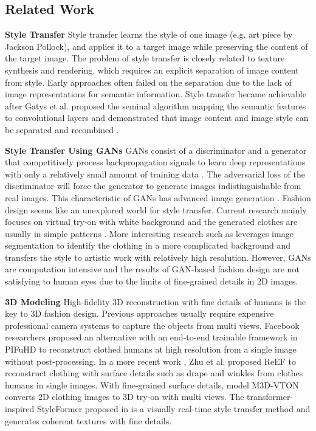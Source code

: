 \documentclass{article}
\begin{document}
\subsection{Related Work}

\textbf{Style Transfer} Style transfer learns the style of one image (e.g. art piece by Jackson Pollock), and applies it to a target image while preserving the content of the target image. The problem of style transfer is closely related to texture synthesis and rendering, which requires an explicit separation of image content from style. Early approaches\cite{Hertzmann2001st, Ashikhmin2003st} often failed on the separation due to the lack of image representations for semantic information. Style transfer became achievable after Gatys et al. proposed the seminal algorithm mapping the semantic features to convolutional layers and demonstrated that image content and image style can be separated and recombined \cite{gatys2016styleTransfer}. 

\textbf{Style Transfer Using GANs} GANs consist of a discriminator and a generator that competitively process backpropagation signals to learn deep representations with only a relatively small amount of training data \cite{creswell2018GANoverview, goodfellow2014GAN}. The adversarial loss of the discriminator will force the generator to generate images indistinguishable from real images. This characteristic of GANs has advanced image generation \cite{denton2015deepGAN, radford2015unsupervisedGAN}. Fashion design seems like an unexplored world for style transfer. Current research mainly focuses on virtual try-on with white background and the generated clothes are usually in simple patterns \cite{kato2019ganClothing, liu2021fashionVisTool, yildirim2019customOutfits}. More interesting research such as \cite{wang2020fashionSegmentation} leverages image segmentation to identify the clothing in a more complicated background and transfers the style to artistic work with relatively high resolution. However, GANs are computation intensive and the results of GAN-based fashion design are not satisfying to human eyes due to the limits of fine-grained details in 2D images.

\textbf{3D Modeling} High-fidelity 3D reconstruction with fine details of humans is the key to 3D fashion design. Previous approaches usually require expensive professional camera systems to capture the objects from multi views. Facebook researchers proposed an alternative with an end-to-end trainable framework in PIFuHD \cite{saito2020PIFuHD} to reconstruct clothed humans at high resolution from a single image without post-processing. In a more recent work \cite{zhureef}, Zhu et al. proposed ReEF to reconstruct clothing with surface details such as drape and winkles from clothes humans in single images. With fine-grained surface details, model M3D-VTON \cite{m3dvton} converts 2D clothing images to 3D try-on with multi views. The transformer-inspired StyleFormer proposed in \cite{wu2021styleformer} is a visually real-time style transfer method and generates coherent textures with fine details. 
\end{document}
